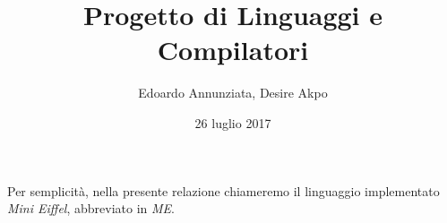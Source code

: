 \documentclass[10pt,a4paper]{article}
\title{Progetto di Linguaggi e Compilatori}
\author{Edoardo Annunziata, Desire Akpo}
\date{26 luglio 2017}
\def \ME {\textit{ME}}%
\theoremstyle{definition}%
\begin{document}
	\maketitle

	Per semplicit\`a, nella presente relazione chiameremo il linguaggio
	implementato \textit{Mini Eiffel}, abbreviato in \ME.

	
	
	
\end{document}

